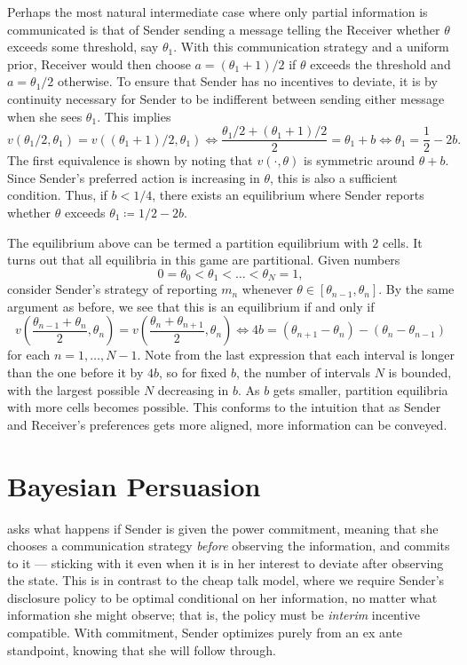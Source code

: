 Perhaps the most natural intermediate case where only partial information is communicated is that of Sender sending a message telling the Receiver whether \(\theta\) exceeds some threshold, say \(\theta_1\).
With this communication strategy and a uniform prior, Receiver would then choose \(a = (\theta_1 + 1) / 2\) if \(\theta\) exceeds the threshold and \(a = \theta_1 / 2\) otherwise.
To ensure that Sender has no incentives to deviate, it is by continuity necessary for Sender to be indifferent between sending either message when she sees \(\theta_1\).
This implies
\[
  v\left( \theta_1 / 2, \theta_1 \right)
  = v\left( (\theta_1 + 1) / 2, \theta_1 \right)
  \iff \frac{\theta_1 / 2 + (\theta_1 + 1) / 2}{2} = \theta_1 + b
  \iff \theta_1 = \frac{1}{2} - 2b.
\]
The first equivalence is shown by noting that \(v(\cdot, \theta)\) is symmetric around \(\theta + b\).
Since Sender's preferred action is increasing in \(\theta\), this is also a sufficient condition.
Thus, if \(b < 1 / 4\), there exists an equilibrium where Sender reports whether \(\theta\) exceeds \(\theta_1 \coloneq 1 / 2 - 2b\).

The equilibrium above can be termed a partition equilibrium with \(2\) cells.
It turns out that all equilibria in this game are partitional.
Given numbers
\[
  0 = \theta_0 < \theta_1 < \dots < \theta_N = 1,
\]
consider Sender's strategy of reporting \(m_n\) whenever \(\theta \in [\theta_{n - 1}, \theta_n]\).
By the same argument as before, we see that this is an equilibrium if and only if
\[
  v\left( \frac{\theta_{n - 1} + \theta_n}{2}, \theta_n \right)
  = v\left( \frac{\theta_n + \theta_{n + 1}}{2}, \theta_n \right)
  \iff 4b = (\theta_{n + 1} - \theta_n) - (\theta_n - \theta_{n - 1})
\]
for each \(n = 1, \dots, N - 1\).
Note from the last expression that each interval is longer than the one before it by \(4b\), so for fixed \(b\), the number of intervals \(N\) is bounded, with the largest possible \(N\) decreasing in \(b\).
As \(b\) gets smaller, partition equilibria with more cells becomes possible.
This conforms to the intuition that as Sender and Receiver's preferences gets more aligned, more information can be conveyed.


\section{Bayesian Persuasion}
\Textcite{kamenica2011BayesianPersuasion} asks what happens if Sender is given the power commitment, meaning that she chooses a communication strategy \emph{before} observing the information, and commits to it --- sticking with it even when it is in her interest to deviate after observing the state.
This is in contrast to the cheap talk model, where we require Sender's disclosure policy to be optimal conditional on her information, no matter what information she might observe; that is, the policy must be \emph{interim} incentive compatible.
With commitment, Sender optimizes purely from an ex ante standpoint, knowing that she will follow through.

